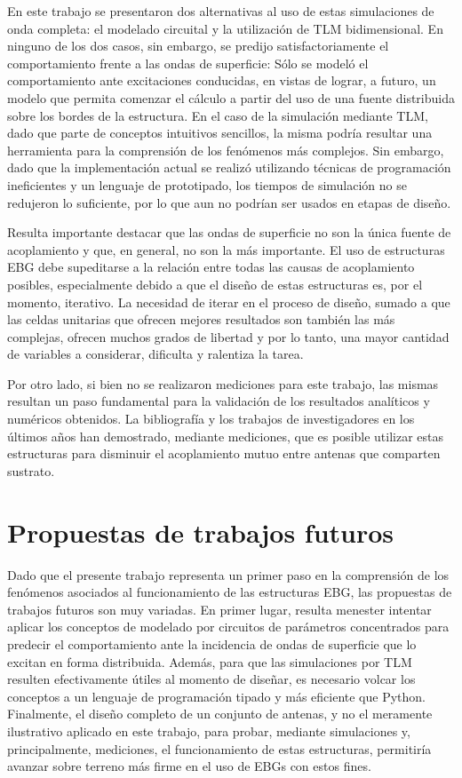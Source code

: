 En este trabajo se presentaron dos alternativas al uso de estas simulaciones de onda completa: el modelado circuital y la utilización de TLM bidimensional. En ninguno de los dos casos, sin embargo, se predijo satisfactoriamente el comportamiento frente a las ondas de superficie: Sólo se modeló el comportamiento ante excitaciones conducidas, en vistas de lograr, a futuro, un modelo que permita comenzar el cálculo a partir del uso de una fuente distribuida sobre los bordes de la estructura. En el caso de la simulación mediante TLM, dado que parte de conceptos intuitivos sencillos, la misma podría resultar una herramienta para la comprensión de los fenómenos más complejos. Sin embargo, dado que la implementación actual se realizó utilizando técnicas de programación ineficientes y un lenguaje de prototipado, los tiempos de simulación no se redujeron lo suficiente, por lo que aun no podrían ser usados en etapas de diseño.

Resulta importante destacar que las ondas de superficie no son la única fuente de acoplamiento y que, en general, no son la más importante. El uso de estructuras EBG debe supeditarse a la relación entre todas las causas de acoplamiento posibles, especialmente debido a que el diseño de estas estructuras es, por el momento, iterativo. La necesidad de iterar en el proceso de diseño, sumado a que las celdas unitarias que ofrecen mejores resultados son también las más complejas, ofrecen muchos grados de libertad y por lo tanto, una mayor cantidad de variables a considerar, dificulta y ralentiza la tarea.

Por otro lado, si bien no se realizaron mediciones para este trabajo, las mismas resultan un paso fundamental para la validación de los resultados analíticos y numéricos obtenidos. La bibliografía y los trabajos de investigadores en los últimos años han demostrado, mediante mediciones, que es posible utilizar estas estructuras para disminuir el acoplamiento mutuo entre antenas que comparten sustrato.

\section{Propuestas de trabajos futuros}

Dado que el presente trabajo representa un primer paso en la comprensión de los fenómenos asociados al funcionamiento de las estructuras EBG, las propuestas de trabajos futuros son muy variadas. En primer lugar, resulta menester intentar aplicar los conceptos de modelado por circuitos de parámetros concentrados para predecir el comportamiento ante la incidencia de ondas de superficie que lo excitan en forma distribuida. Además, para que las simulaciones por TLM resulten efectivamente útiles al momento de diseñar, es necesario volcar los conceptos a un lenguaje de programación tipado y más eficiente que Python. Finalmente, el diseño completo de un conjunto de antenas, y no el meramente ilustrativo aplicado en este trabajo, para probar, mediante simulaciones y, principalmente, mediciones, el funcionamiento de estas estructuras, permitiría avanzar sobre terreno más firme en el uso de EBGs con estos fines.

